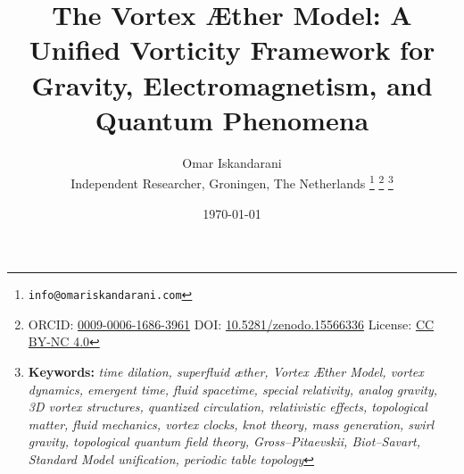 \documentclass[a4paper,10pt]{article}
\begin{document}
    \title{The Vortex Æther Model: A Unified Vorticity Framework for Gravity, Electromagnetism, and Quantum Phenomena}
    \date{\today}
    \author{
        Omar Iskandarani\\
        \small Independent Researcher, Groningen, The Netherlands
        \thanks{\texttt{info@omariskandarani.com}}
        \thanks{ORCID: \href{https://orcid.org/0009-0006-1686-3961}{0009-0006-1686-3961} \quad DOI: \href{https://doi.org/10.5281/zenodo.15566336}{10.5281/zenodo.15566336} \quad License: \href{https://creativecommons.org/licenses/by/4.0/}{CC BY-NC 4.0}}
        \noindent\thanks{\textbf{Keywords:} \textit{time dilation, superfluid æther, Vortex Æther Model, vortex dynamics, emergent time, fluid spacetime, special relativity, analog gravity, 3D vortex structures, quantized circulation, relativistic effects, topological matter, fluid mechanics, vortex clocks, knot theory, mass generation, swirl gravity, topological quantum field theory, Gross--Pitaevskii, Biot--Savart, Standard Model unification, periodic table topology}}
    }
    \maketitle
\end{document}
